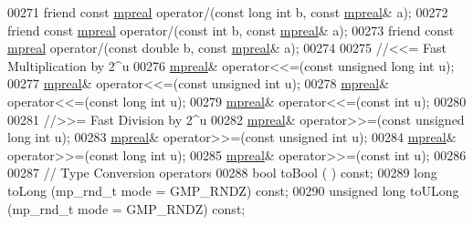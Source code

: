 \begin{DoxyCode}
00271     \textcolor{keyword}{friend} \textcolor{keyword}{const} \hyperlink{classmpfr_1_1mpreal}{mpreal} operator/(\textcolor{keyword}{const} \textcolor{keywordtype}{long} \textcolor{keywordtype}{int} b,          \textcolor{keyword}{const} \hyperlink{classmpfr_1_1mpreal}{mpreal}& a);
00272     \textcolor{keyword}{friend} \textcolor{keyword}{const} \hyperlink{classmpfr_1_1mpreal}{mpreal} operator/(\textcolor{keyword}{const} \textcolor{keywordtype}{int} b,               \textcolor{keyword}{const} \hyperlink{classmpfr_1_1mpreal}{mpreal}& a);
00273     \textcolor{keyword}{friend} \textcolor{keyword}{const} \hyperlink{classmpfr_1_1mpreal}{mpreal} operator/(\textcolor{keyword}{const} \textcolor{keywordtype}{double} b,            \textcolor{keyword}{const} \hyperlink{classmpfr_1_1mpreal}{mpreal}& a);
00274 
00275     \textcolor{comment}{//<<= Fast Multiplication by 2^u}
00276     \hyperlink{classmpfr_1_1mpreal}{mpreal}& operator<<=(\textcolor{keyword}{const} \textcolor{keywordtype}{unsigned} \textcolor{keywordtype}{long} \textcolor{keywordtype}{int} u);
00277     \hyperlink{classmpfr_1_1mpreal}{mpreal}& operator<<=(\textcolor{keyword}{const} \textcolor{keywordtype}{unsigned} \textcolor{keywordtype}{int} u);
00278     \hyperlink{classmpfr_1_1mpreal}{mpreal}& operator<<=(\textcolor{keyword}{const} \textcolor{keywordtype}{long} \textcolor{keywordtype}{int} u);
00279     \hyperlink{classmpfr_1_1mpreal}{mpreal}& operator<<=(\textcolor{keyword}{const} \textcolor{keywordtype}{int} u);
00280 
00281     \textcolor{comment}{//>>= Fast Division by 2^u}
00282     \hyperlink{classmpfr_1_1mpreal}{mpreal}& operator>>=(\textcolor{keyword}{const} \textcolor{keywordtype}{unsigned} \textcolor{keywordtype}{long} \textcolor{keywordtype}{int} u);
00283     \hyperlink{classmpfr_1_1mpreal}{mpreal}& operator>>=(\textcolor{keyword}{const} \textcolor{keywordtype}{unsigned} \textcolor{keywordtype}{int} u);
00284     \hyperlink{classmpfr_1_1mpreal}{mpreal}& operator>>=(\textcolor{keyword}{const} \textcolor{keywordtype}{long} \textcolor{keywordtype}{int} u);
00285     \hyperlink{classmpfr_1_1mpreal}{mpreal}& operator>>=(\textcolor{keyword}{const} \textcolor{keywordtype}{int} u);
00286 
00287     \textcolor{comment}{// Type Conversion operators}
00288     \textcolor{keywordtype}{bool}               toBool      (                        )    \textcolor{keyword}{const};
00289     \textcolor{keywordtype}{long}               toLong      (mp\_rnd\_t mode = GMP\_RNDZ)    \textcolor{keyword}{const};
00290     \textcolor{keywordtype}{unsigned} \textcolor{keywordtype}{long}      toULong     (mp\_rnd\_t mode = GMP\_RNDZ)    \textcolor{keyword}{const};

\end{DoxyCode}
